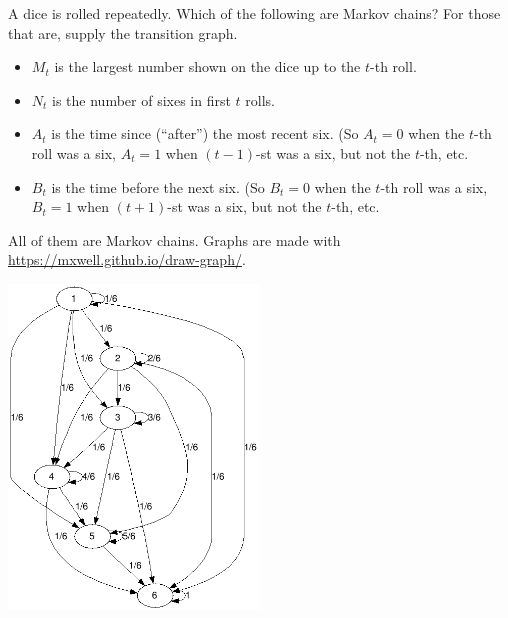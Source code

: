 \documentclass[12pt]{article}					%
\begin{document}
\begin{priklad}
	A dice is rolled repeatedly. Which of the following are Markov chains? For those that are, supply the transition graph.

	\begin{itemize}
		\item $M_t$ is the largest number shown on the dice up to the $t$-th roll.
		\item $N_t$ is the number of sixes in first $t$ rolls.
		\item $A_t$ is the time since (“after”) the most recent six. (So $A_t = 0$ when the $t$-th roll was a six, $A_t = 1$ when $(t−1)$-st was a six, but not the $t$-th, etc.
		\item $B_t$ is the time before the next six.
(So $B_t = 0$ when the $t$-th roll was a six, $B_t = 1$ when $(t+1)$-st was a six, but not the $t$-th, etc.
	\end{itemize}

	\begin{reseni}
		All of them are Markov chains. Graphs are made with \url{https://mxwell.github.io/draw-graph/}.
	\end{reseni}

	\begin{reseni}
		\includegraphics[width=0.5\textwidth]{chart.png}
	\end{reseni}
		

\end{priklad}
\end{document}
